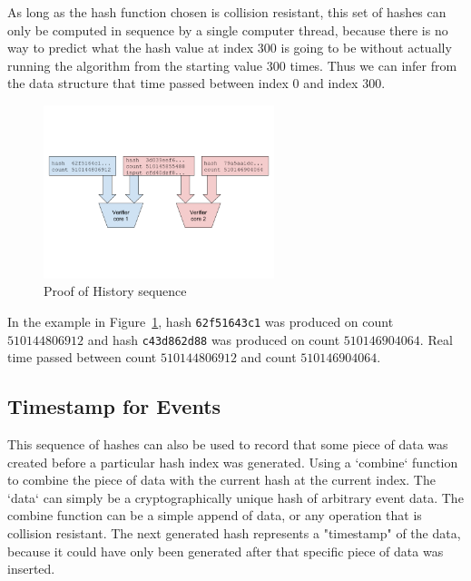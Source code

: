 \documentclass[12pt]{article}
\begin{document}
As long as the hash function chosen is collision resistant, this set of hashes can only be computed in sequence by a single computer thread, because there is no way to predict what the hash value at index $300$ is going to be without actually running the algorithm from the starting value $300$ times.  Thus we can infer from the data structure that time passed between index $0$ and index $300$.

\begin{figure}
  \begin{center}
    \centering
    \includegraphics[width=0.6\textwidth]{figures/fig_2.png}
    \caption[Figure 2]{Proof of History sequence\label{fig:poh_seq}}
  \end{center}
  \end{figure}

In the example in Figure~\ref{fig:poh_seq}, hash \texttt{62f51643c1} was produced on
count $510144806912$ and hash \texttt{c43d862d88} was produced on
count $510146904064$. Real time passed between count $510144806912$
and count $510146904064$.

\subsection{Timestamp for Events}

This sequence of hashes can also be used to record that some piece of data was created before a particular hash index was generated. Using a `combine` function to combine the piece of data with the current hash at the current index. The `data` can simply be a cryptographically unique hash of arbitrary event data. The combine function can be a simple append of data, or any operation that is collision resistant. The next generated hash represents a "timestamp" of the data, because it could have only been generated after that specific piece of data was inserted.\\
\end{document}
